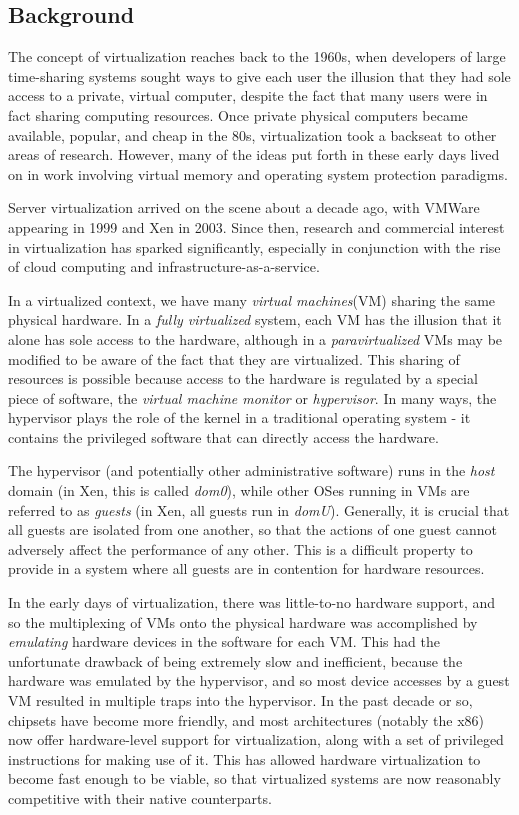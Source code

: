 \documentclass[10pt]{article}
\begin{document}
\begin{multicols*}{2}
\section{Background}
\label{sec:background}

The concept of virtualization reaches back to the 1960s, when developers
of large time-sharing systems sought ways to give each user the illusion that
they had sole access to a private, virtual computer, despite the fact that
many users were in fact sharing computing resources.  Once private physical
computers became available, popular, and cheap in the 80s, virtualization
took a backseat to other areas of research.  However, many of the ideas
put forth in these early days lived on in work involving virtual memory
and operating system protection paradigms.

Server virtualization arrived on the scene about a decade ago, with VMWare
appearing in 1999 and Xen in 2003.  Since then, research and commercial interest
in virtualization has sparked significantly, especially in conjunction
with the rise of cloud computing and infrastructure-as-a-service.

In a virtualized context, we have many \emph{virtual machines}(VM) sharing the same
physical hardware.  In a \emph{fully virtualized} system, each VM has the illusion
that it alone has sole access to the hardware, although in a \emph{paravirtualized}
VMs may be modified to be aware of the fact that they are virtualized.  This
sharing of resources is possible because access to the hardware is regulated by
a special piece of software, the \emph{virtual machine monitor} or \emph{hypervisor}.
In many ways, the hypervisor plays the role of the kernel in a traditional operating
system - it contains the privileged software that can directly access the hardware.

The hypervisor (and potentially other administrative software) runs in the \emph{host}
domain (in Xen, this is called \emph{dom0}), while other OSes running in VMs are 
referred to as \emph{guests} (in Xen, all guests run in \emph{domU}).  Generally, it is
crucial that all guests are isolated from one another, so that the actions of one guest
cannot adversely affect the performance of any other.  This is a difficult property
to provide in a system where all guests are in contention for hardware resources.

In the early days of virtualization, there was little-to-no hardware support,
and so the multiplexing of VMs onto the physical hardware was accomplished by
\emph{emulating} hardware devices in the software for each VM.  This had the unfortunate
drawback of being extremely slow and inefficient, because the hardware was emulated by
the hypervisor, and so most device accesses by a guest VM resulted in multiple traps
into the hypervisor.  In the past decade or so, chipsets have become more friendly,
and most architectures (notably the x86) now offer hardware-level support for
virtualization, along with a set of privileged instructions for making use of it.
This has allowed hardware virtualization to become fast enough to be viable,
so that virtualized systems are now reasonably competitive with their native
counterparts.


\end{multicols*}
\end{document}
